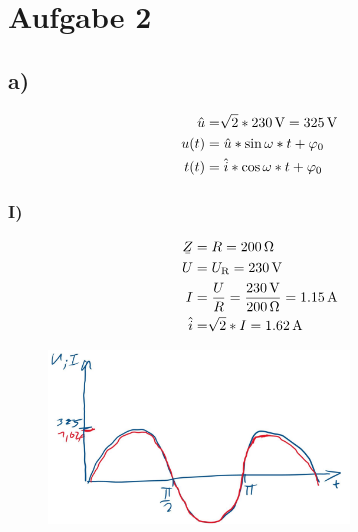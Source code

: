\documentclass[../../document.tex]{subfiles}
\begin{document}
\section*{Aufgabe 2}

\subsection*{a)}

\begin{equation*}
    \begin{split}
        \hat{u} &= \sqrt[]{2} * \SI{230}{\volt} = \SI{325}{\volt}\\
        u(t) &= \hat{u} * \sin{\omega * t + \varphi_{\textrm{0}}}\\
        t(t) &= \hat{i} * \cos{\omega * t + \varphi_{\textrm{0}}}\\
    \end{split}
\end{equation*}

\subsubsection*{I)}

\begin{equation*}
    \begin{split}
        \ubar{Z} &= R = \SI{200}{\ohm}\\
        U &= U\cind{R} = \SI{230}{\volt}\\
        I &= \frac{U}{R} = \frac{\SI{230}{\volt}}{\SI{200}{\ohm}} = \SI{1,15}{\ampere}\\
        \hat{i} &= \sqrt[]{2} *I = \SI{1,62}{\ampere}\\
    \end{split}
\end{equation*}

\begin{figure}[H]
    \begin{center}
        \includegraphics[width=8cm]{../../img/task1-a-i.jpeg}
    \end{center}
\end{figure}
\end{document}
